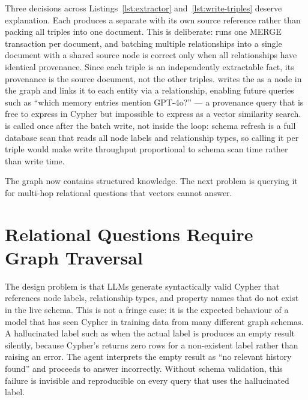 Three decisions across Listings~\ref{lst:extractor}
and~\ref{lst:write-triples} deserve explanation. Each 
produces a separate  with its own source reference
rather than packing all triples into one document. This is deliberate:
 runs one MERGE transaction per document,
and batching multiple relationships into a single document with a shared
source node is correct only when all relationships have identical
provenance. Since each triple is an independently extractable fact, its
provenance is the source document, not the other triples.
 writes the  as a
 node in the graph and links it to each entity via a
 relationship, enabling future queries such as ``which
memory entries mention GPT-4o?'' --- a provenance query that is free to
express in Cypher but impossible to express as a vector similarity search.
 is called once after the batch write, not
inside the loop: schema refresh is a full database scan that reads all
node labels and relationship types, so calling it per triple would make
write throughput proportional to schema scan time rather than write time.

The graph now contains structured knowledge. The next problem is querying
it for multi-hop relational questions that vectors cannot answer.


\section{Relational Questions Require Graph Traversal}
\label{sec:kg-multihop}

The design problem is that LLMs generate syntactically valid Cypher that
references node labels, relationship types, and property names that do not
exist in the live schema. This is not a fringe case: it is the expected
behaviour of a model that has seen Cypher in training data from many
different graph schemas. A hallucinated label such as 
when the actual label is  produces an empty result
silently, because Cypher's  returns zero rows for a
non-existent label rather than raising an error. The agent interprets the
empty result as ``no relevant history found'' and proceeds to answer
incorrectly. Without schema validation, this failure is invisible and
reproducible on every query that uses the hallucinated label.

